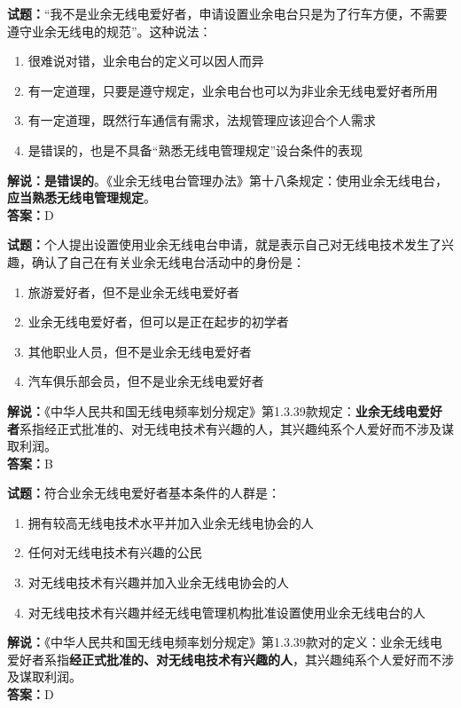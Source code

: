 \documentclass{ctexbook}
\begin{document}
\vspace{\baselineskip}

\noindent\textbf{试题：}“我不是业余无线电爱好者，申请设置业余电台只是为了行车方便，不需要遵守业余无线电的规范”。这种说法：
\begin{enumerate}[leftmargin=3em]
  \item 很难说对错，业余电台的定义可以因人而异
  \item 有一定道理，只要是遵守规定，业余电台也可以为非业余无线电爱好者所用
  \item 有一定道理，既然行车通信有需求，法规管理应该迎合个人需求
  \item 是错误的，也是不具备“熟悉无线电管理规定”设台条件的表现
\end{enumerate}
\noindent\textbf{解说：}\textbf{是错误的}。《业余无线电台管理办法》第十八条规定：使用业余无线电台，\textbf{应当熟悉无线电管理规定}。\\\noindent\textbf{答案：}D

\vspace{\baselineskip}

\noindent\textbf{试题：}个人提出设置使用业余无线电台申请，就是表示自己对无线电技术发生了兴趣，确认了自己在有关业余无线电台活动中的身份是：
\begin{enumerate}[leftmargin=3em]
  \item 旅游爱好者，但不是业余无线电爱好者
  \item 业余无线电爱好者，但可以是正在起步的初学者
  \item 其他职业人员，但不是业余无线电爱好者
  \item 汽车俱乐部会员，但不是业余无线电爱好者
\end{enumerate}
\noindent\textbf{解说：}《中华人民共和国无线电频率划分规定》第1.3.39款规定：\textbf{业余无线电爱好者}系指经正式批准的、对无线电技术有兴趣的人，其兴趣纯系个人爱好而不涉及谋取利润。\\\noindent\textbf{答案：}B

\vspace{\baselineskip}

\noindent\textbf{试题：}符合业余无线电爱好者基本条件的人群是：
\begin{enumerate}[leftmargin=3em]
  \item 拥有较高无线电技术水平并加入业余无线电协会的人
  \item 任何对无线电技术有兴趣的公民
  \item 对无线电技术有兴趣并加入业余无线电协会的人
  \item 对无线电技术有兴趣并经无线电管理机构批准设置使用业余无线电台的人
\end{enumerate}
\noindent\textbf{解说：}《中华人民共和国无线电频率划分规定》第1.3.39款对的定义：业余无线电爱好者系指\textbf{经正式批准的、对无线电技术有兴趣的人}，其兴趣纯系个人爱好而不涉及谋取利润。\\\noindent\textbf{答案：}D
\end{document}
